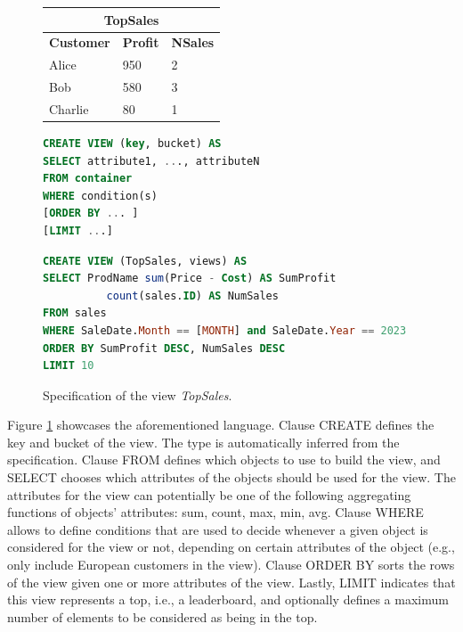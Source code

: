 \documentclass[sigconf, nonacm]{acmart}
\newcommand{\qcr}[1]{{\fontfamily{qcr}\selectfont #1}}
\begin{document}
\begin{figure}
	\setlength\tabcolsep{3.5pt}
	\begin{minipage}{0.19\textwidth}
		\small
		\begin{tabular}{lll}
			\multicolumn{3}{c}{\textbf{TopSales}} \vspace{0.4em}        \\
			\hline                                               
			\textbf{Customer}   & \textbf{Profit} & \textbf{NSales} \\ \hline
			Alice & 950     & 2        \\
			Bob  & 580      & 3        \\
			Charlie   & 80      & 1        \\ \hline
		\end{tabular}
		\vspace{1em}
		\label{table:topSales}
	\end{minipage} \hfill
	\begin{minipage}{0.27\textwidth}
	\begin{lstlisting}[language=SQL]
CREATE VIEW (key, bucket) AS
SELECT attribute1, ..., attributeN
FROM container
WHERE condition(s) 
[ORDER BY ... ]
[LIMIT ...]
		\end{lstlisting}
		\label{fig:viewSQL}
	\end{minipage}
\end{figure}

\begin{figure}[t]
\small{
\begin{lstlisting}[language=SQL]
CREATE VIEW (TopSales, views) AS 
SELECT ProdName sum(Price - Cost) AS SumProfit
	      count(sales.ID) AS NumSales 
FROM sales 
WHERE SaleDate.Month == [MONTH] and SaleDate.Year == 2023
ORDER BY SumProfit DESC, NumSales DESC 
LIMIT 10
\end{lstlisting}}
	\caption{Specification of the view \emph{TopSales}.}
	\label{fig:topSalesSQL}
\end{figure}

Figure \ref{fig:viewSQL} showcases the aforementioned language.
Clause \qcr{CREATE} defines the key and bucket of the view.
The type is automatically inferred from the specification.
Clause \qcr{FROM} defines which objects to use to build the view, and \qcr{SELECT} chooses which attributes of the objects should be used for the view.
The attributes for the view can potentially be one of the following aggregating functions of objects' attributes: \qcr{sum}, \qcr{count}, \qcr{max}, \qcr{min}, \qcr{avg}.
Clause \qcr{WHERE} allows to define conditions that are used to decide whenever a given object is considered for the view or not, depending on certain attributes of the object (e.g., only include European customers in the view).
Clause \qcr{ORDER BY} sorts the rows of the view given one or more attributes of the view.
Lastly, \qcr{LIMIT} indicates that this view represents a top, i.e., a leaderboard, and optionally defines a maximum number of elements to be considered as being in the top.
\end{document}
